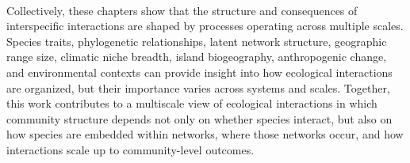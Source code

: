 \paragraph*{} Collectively, these chapters show that the structure and consequences of interspecific interactions are shaped by processes operating across multiple scales. Species traits, phylogenetic relationships, latent network structure, geographic range size, climatic niche breadth, island biogeography, anthropogenic change, and environmental contexts can provide insight into how ecological interactions are organized, but their importance varies across systems and scales. Together, this work contributes to a multiscale view of ecological interactions in which community structure depends not only on whether species interact, but also on how species are embedded within networks, where those networks occur, and how interactions scale up to community-level outcomes.
